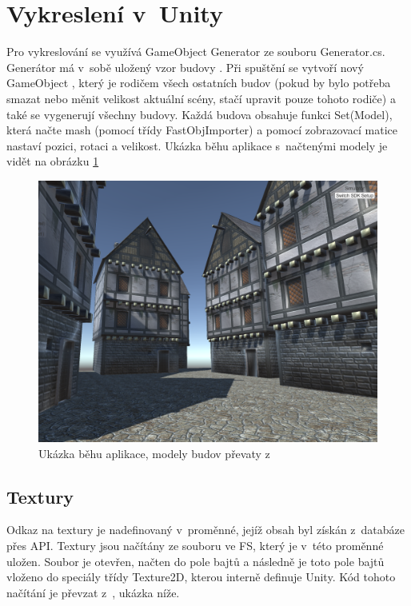 \documentclass[thesis=B,czech]{FITthesis}[2012/06/26]
\begin{document}
	
	\section{Vykreslení v~Unity}
    Pro vykreslování se využívá GameObject Generator ze souboru Generator.cs. Generátor má v~sobě uložený vzor budovy . Při spuštění se vytvoří nový GameObject , který je rodičem všech ostatních budov (pokud by bylo potřeba smazat nebo měnit velikost aktuální scény, stačí upravit pouze tohoto rodiče) a také se vygenerují všechny budovy. Každá budova obsahuje funkci Set(Model), která načte mash (pomocí třídy FastObjImporter) a pomocí zobrazovací matice nastaví pozici, rotaci a velikost. Ukázka běhu aplikace s~načtenými modely je vidět na obrázku \ref{fig:buildings}
    
    

\begin{figure}
  		\includegraphics[width=\textwidth,height=\textheight,keepaspectratio]{screen1.png}
  		\caption{Ukázka běhu aplikace, modely budov převaty z~\cite{building}}
  		\label{fig:buildings}
	\end{figure}
    
    
    \subsection{Textury}
    
    Odkaz na textury je nadefinovaný v~proměnné, jejíž obsah byl získán z~databáze přes API. Textury jsou načítány ze souboru ve FS, který je v~této proměnné uložen. Soubor je otevřen, načten do pole bajtů a následně je toto pole bajtů vloženo do speciály třídy Texture2D, kterou interně definuje Unity. Kód tohoto načítání je převzat z~\cite{unityFAQtext}, ukázka níže.
\end{document}
